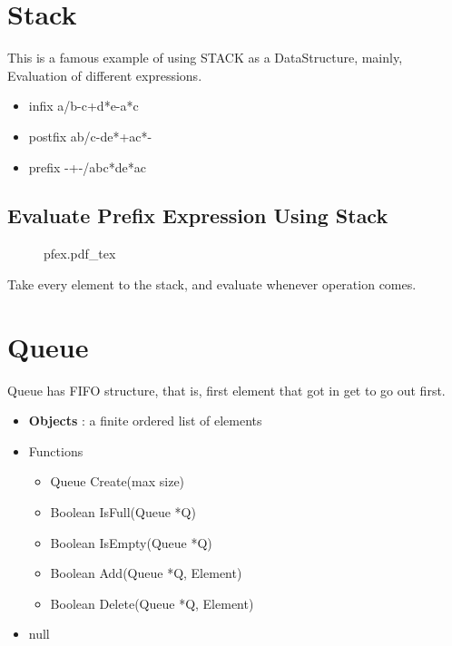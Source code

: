 \documentclass[12pt]{article}
\begin{document}
\maketitle
\section{Stack}


This is a famous example of using STACK as a DataStructure, mainly, Evaluation of different expressions.

\begin{itemize}
  \item infix
  a/b-c+d*e-a*c
  \item postfix
  ab/c-de*+ac*-
  \item prefix
  -+-/abc*de*ac
\end{itemize}

\subsection{Evaluate Prefix Expression Using Stack}

\begin{figure}[H]
	\centering
	\def\svgwidth{\columnwidth}
	{pfex.pdf_tex}

	\label{fig:pfex}
\end{figure}

Take every element to the stack, and evaluate whenever operation comes.

\section{Queue}

Queue has FIFO structure, that is, first element that got in get to go out first.
\begin{itemize}
    \item \textbf{Objects} : a finite ordered list of elements
    \item Functions
  \begin{itemize}
    \item Queue Create(max size)
    \item Boolean IsFull(Queue *Q)
    \item Boolean IsEmpty(Queue *Q)
    \item Boolean Add(Queue *Q, Element)
    \item Boolean Delete(Queue *Q, Element)
  \end{itemize}
  \item null
\end{itemize}
\end{document}
